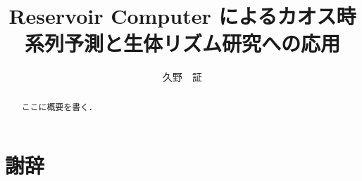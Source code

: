 \documentclass[uplatex]{suribt}
\title{Reservoir Computer によるカオス時系列予測と生体リズム研究への応用}
\author{久野　証}
\begin{document}
\maketitle%

\frontmatter%
\begin{abstract}%
 ここに概要を書く．
\end{abstract}

\tableofcontents%

\mainmatter%
\chapter{}

\cite{RODRIGUES20161}

\backmatter%
\chapter{謝辞}%


\appendix%
\chapter{}
\end{document}
